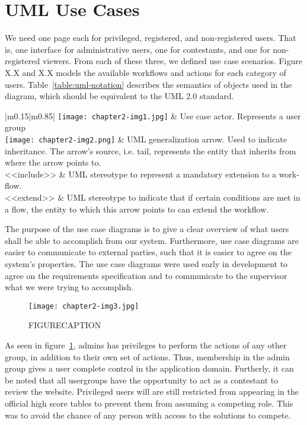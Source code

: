 \section{UML Use Cases}
We need one page each for privileged, registered, and non-registered
users. That is, one interface for administrative users, one for
contestants, and one for non-registered viewers. From each of these
three, we defined use case scenarios. Figure X.X and X.X models the
available workflows and actions for each category of users. Table~\ref{table:uml-notation}
describes the semantics of objects used in the diagram, which should be
equivalent to the UML 2.0 standard.
\begin{table}
\caption{UML Notation}
\label{table:uml-notation}
\tablehead{}
\begin{supertabular}{|m{0.15\textwidth}|m{0.85\textwidth}|}
\hline
	\texttt{[image: chapter2-img1.jpg]}  &
Use case actor. Represents a user group\\\hline
	\texttt{[image: chapter2-img2.png]}  &
UML generalization arrow. Used to indicate inheritance. The
arrow's source, i.e. tail, represents the entity that
inherits from where the arrow points to.\\\hline
{\textless}{\textless}include{\textgreater}{\textgreater} &
UML stereotype to represent a mandatory extension to a
work{}-flow.\\\hline
{\textless}{\textless}extend{\textgreater}{\textgreater} &
UML stereotype to indicate that if certain conditions are met in a flow,
the entity to which this arrow points to can extend the
workflow.\\\hline
\end{supertabular}
\end{table}

The purpose of the use case diagrams is to give a clear overview of what
users shall be able to accomplish from our system. Furthermore, use
case diagrams are easier to communicate to external parties, such that
it is easier to agree on the system's properties. The
use case diagrams were used early in development to agree on the
requirements specification and to communicate to the supervisor what we
were trying to accomplish.

\begin{figure}[h!]
	\texttt{[image: chapter2-img3.jpg]} 
	\caption{FIGURECAPTION}
	\label{figure:usecase}
\end{figure}
As seen in figure~\ref{figure:usecase}, admins has privileges to perform the actions of
any other group, in addition to their own set of actions. Thus,
membership in the admin group gives a user complete control in the
application domain. Furtherly, it can be noted that all usergroups have
the opportunity to act as a contestant to review the website.
Privileged users will are still restricted from appearing in the
official high score tables to prevent them from assuming a competing
role. This was to avoid the chance of any person with access to the
solutions to compete.







